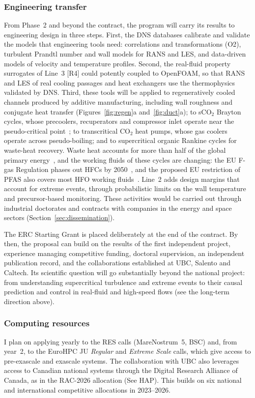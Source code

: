 \documentclass[11pt]{article}
\begin{document}
\subsubsection{Engineering transfer} 
From Phase~2 and beyond the contract, the program will carry its results to engineering design in three steps. First, the DNS databases calibrate and validate the models that engineering tools need: correlations and transformations (O2), turbulent Prandtl number and wall models for RANS and LES, and data-driven models of velocity and temperature profiles.
Second, the real-fluid property surrogates of Line~3 [R4] could potently coupled to OpenFOAM, so that RANS and LES of real cooling passages and heat exchangers use the thermophysics validated by DNS. 
Third, these tools will be applied to regeneratively cooled channels produced by additive manufacturing, including wall roughness and conjugate heat transfer (Figures~\ref{fig:regen}a and~\ref{fig:duct}a); 
to sCO$_2$ Brayton cycles, whose precoolers, recuperators and compressor inlet operate near the pseudo-critical point~\cite{Ahn2015}; 
to transcritical CO$_2$ heat pumps, whose gas coolers operate across pseudo-boiling; and to supercritical organic Rankine cycles for waste-heat recovery. 
Waste heat accounts for more than half of the global primary energy~\cite{Markides2025}, and the working fluids of these cycles are changing:
the EU F-gas Regulation phases out HFCs by 2050~\cite{FGas2024}, and the proposed EU restriction of PFAS also covers most HFO working fluids~\cite{ECHA2025}. 
Line~2 adds design margins that account for extreme events, through probabilistic limits on the wall temperature and precursor-based monitoring.
These activities would be carried out through industrial doctorates and contracts with companies in
the energy and space sectors (Section~\ref{sec:dissemination}).

The ERC Starting Grant is placed deliberately at the end of the contract. By then, the
proposal can build on the results of the first independent project, experience managing
competitive funding, doctoral supervision, an independent publication record, and the
collaborations established at UBC, Salento and Caltech. Its scientific question
will go substantially beyond the national project: from understanding supercritical turbulence
and extreme events to their causal prediction and control in real-fluid and high-speed flows
(see the long-term direction above).

\subsubsection{Computing resources} 
I plan on applying yearly to the RES calls (MareNostrum~5, BSC) and, from year~2, to the EuroHPC JU \emph{Regular} and \emph{Extreme Scale} calls, which give access to pre-exascale and exascale systems. 
The collaboration with UBC also leverages access to Canadian
national systems through the Digital Research Alliance of Canada, as in the RAC-2026 allocation (See HAP). 
This builds on six national and international competitive allocations in 2023--2026.
\end{document}
